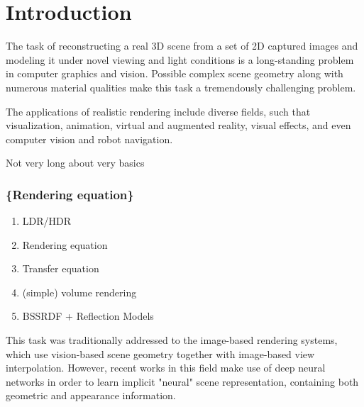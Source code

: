 \chapter{Introduction}
\label{chap:introduction}





The task of reconstructing a real 3D scene from a set of 2D captured images
and modeling it under novel viewing and light conditions
is a long-standing problem in computer graphics and vision.
Possible complex scene geometry along with numerous material qualities
make this task a tremendously challenging problem.

The applications of realistic rendering include diverse fields, such that
visualization, animation, virtual and augmented reality, visual effects,
and even computer vision and robot navigation.


Not very long about very basics
\subsection{\{Rendering equation\} }
\begin{enumerate}
    \item LDR/HDR
    \item Rendering equation
    \item Transfer equation
    \item (simple) volume rendering
    \item BSSRDF + Reflection Models
\end{enumerate}

This task was traditionally addressed to the image-based rendering systems,
which use vision-based scene geometry together with image-based view interpolation. \cite{shumandkang2000}
However, recent works in this field make use of deep neural networks
in order to learn implicit "neural" scene representation,
containing both geometric and appearance information. \cite{tewari2020state}

